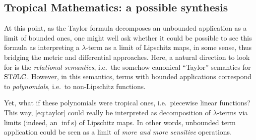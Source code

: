 %


\subsection{Tropical Mathematics: a possible synthesis}%



At this point, as the Taylor formula decomposes an unbounded application as a limit of bounded ones, one might well ask whether it could be possible to see this formula as interpreting  a $\lambda$-term 
as a limit of Lipschitz maps, in some sense, thus bridging the metric and differential approaches.  
Here, a natural direction to look for is the \emph{relational semantics}, i.e.~the somehow canonical ``Taylor'' semantics for $\mathrm{ST}\partial\mathrm{LC}$. 
However, in this semantics, terms with bounded applications correspond to \emph{polynomials}, i.e.~to non-Lipschitz functions. 

Yet, what if these polynomials were tropical ones, i.e.~piecewise linear functions? This way, \eqref{eq:taylor} could really be interpreted as decomposition of $\lambda$-terms via limits (indeed, an $\inf$s) of Lipschitz maps. In other words, unbounded term application could be seen 
as a limit of \emph{more and more sensitive} operations. 



